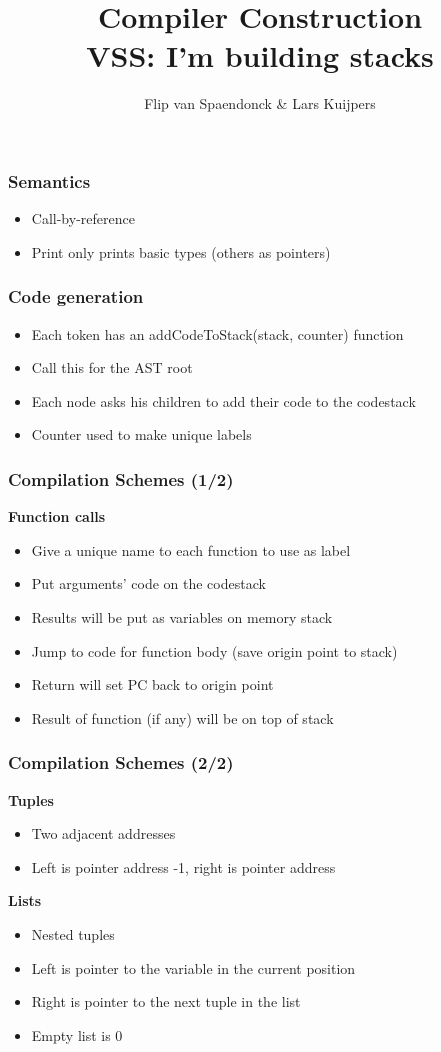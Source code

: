 \documentclass{beamer}
\author[Flip \& Lars]{Flip van Spaendonck \& Lars Kuijpers}
\title{Compiler Construction \\ \lbrack VSS\rbrack : I'm building stacks }
\begin{document}
\begin{frame}
\titlepage
\end{frame}

\begin{frame}
\frametitle{Semantics}
\begin{itemize}
\item Call-by-reference
\item Print only prints basic types (others as pointers)
\end{itemize}
\end{frame}

\begin{frame}
\frametitle{Code generation}
\begin{itemize}
\item Each token has an addCodeToStack(stack, counter) function
\item Call this for the AST root
\item Each node asks his children to add their code to the codestack
\item Counter used to make unique labels
\end{itemize}
\end{frame}

\begin{frame}
\frametitle{Compilation Schemes (1/2)}
\textbf{Function calls}
\begin{itemize}
\item Give a unique name to each function to use as label
\item Put arguments' code on the codestack 
\item Results will be put as variables on memory stack
\item Jump to code for function body (save origin point to stack)
\item Return will set PC back to origin point
\item Result of function (if any) will be on top of stack
\end{itemize}
\end{frame}

\begin{frame}
\frametitle{Compilation Schemes (2/2)}
\textbf{Tuples}
\begin{itemize}
\item Two adjacent addresses
\item Left is pointer address -1, right is pointer address
\end{itemize}

\textbf{Lists}
\begin{itemize}
\item Nested tuples
\item Left is pointer to the variable in the current position
\item Right is pointer to the next tuple in the list
\item Empty list is 0
\end{itemize}
\end{frame}
\end{document}

